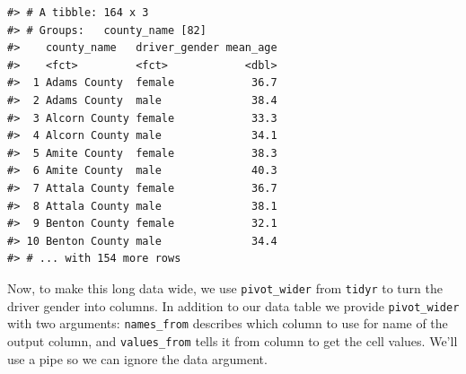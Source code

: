 \documentclass[]{book}
\newenvironment{Shaded}{\begin{snugshade}}{\end{snugshade}}
\newcommand{\DataTypeTok}[1]{\textcolor[rgb]{0.13,0.29,0.53}{#1}}
\newcommand{\KeywordTok}[1]{\textcolor[rgb]{0.13,0.29,0.53}{\textbf{#1}}}
\newcommand{\NormalTok}[1]{#1}
\newcommand{\OperatorTok}[1]{\textcolor[rgb]{0.81,0.36,0.00}{\textbf{#1}}}
\newcommand{\OtherTok}[1]{\textcolor[rgb]{0.56,0.35,0.01}{#1}}
\newcommand{\StringTok}[1]{\textcolor[rgb]{0.31,0.60,0.02}{#1}}
\begin{document}
\begin{Shaded}
\end{Shaded}

\begin{verbatim}
#> # A tibble: 164 x 3
#> # Groups:   county_name [82]
#>    county_name   driver_gender mean_age
#>    <fct>         <fct>            <dbl>
#>  1 Adams County  female            36.7
#>  2 Adams County  male              38.4
#>  3 Alcorn County female            33.3
#>  4 Alcorn County male              34.1
#>  5 Amite County  female            38.3
#>  6 Amite County  male              40.3
#>  7 Attala County female            36.7
#>  8 Attala County male              38.1
#>  9 Benton County female            32.1
#> 10 Benton County male              34.4
#> # ... with 154 more rows
\end{verbatim}

Now, to make this long data wide, we use \texttt{pivot\_wider} from \texttt{tidyr} to turn the driver gender into columns. In addition to our data table we provide \texttt{pivot\_wider} with two arguments: \texttt{names\_from} describes which column to use for name of the output column, and \texttt{values\_from} tells it from column to get the cell values. We'll use a pipe so we can ignore the data argument.

\begin{Shaded}
\end{Shaded}
\end{document}
